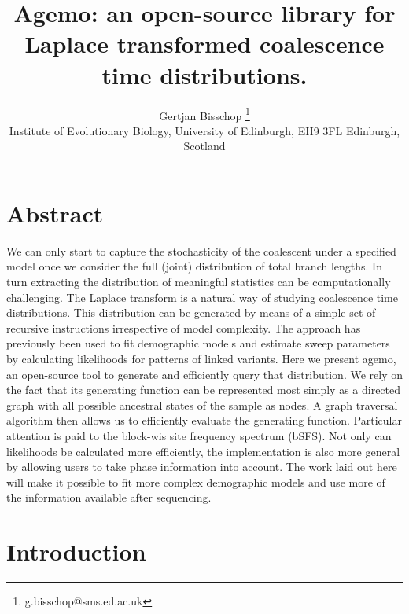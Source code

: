 \documentclass[10pt, a4]{article}
\title{Agemo: an open-source library for Laplace transformed coalescence time distributions.}
\author{Gertjan Bisschop \thanks{g.bisschop@sms.ed.ac.uk} \\ Institute of Evolutionary Biology, University of Edinburgh, EH9 3FL Edinburgh, Scotland}
\date{}
\begin{document}
\maketitle

\section*{Abstract} 
We can only start to capture the stochasticity of the coalescent under a specified model once we consider the full (joint) distribution of total branch lengths. In turn extracting the distribution of meaningful statistics can be computationally challenging. 
The Laplace transform is a natural way of studying coalescence time distributions. This distribution can be generated by means of a simple set of recursive instructions irrespective of model complexity. The approach has previously been used to fit demographic models and estimate sweep parameters by calculating likelihoods for patterns of linked variants. %
%
Here we present agemo, an open-source tool to generate and efficiently query that distribution. We rely on the fact that its generating function can be represented most simply as a directed graph with all possible ancestral states of the sample as nodes. A graph traversal algorithm then allows us to efficiently evaluate the generating function. 
%
Particular attention is paid to the block-wis site frequency spectrum (bSFS). Not only can likelihoods be calculated more efficiently, the implementation is also more general by allowing users to take phase information into account. The work laid out here will make it possible to fit more complex demographic models and use more of the information available after sequencing.


\vspace{0.25cm} 
\linenumbers

\section{Introduction}
\end{document}
